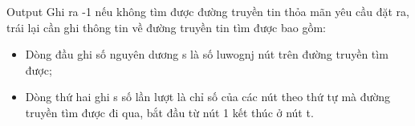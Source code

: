 Output
Ghi ra -1 nếu không tìm được đường truyền tin thỏa mãn yêu cầu đặt ra, trái lại cần ghi thông tin về đường truyền tin tìm được bao gồm:
\begin{itemize}
	\item Dòng đầu ghi số nguyên dương s là số luwognj nút trên đường truyền tìm được;
	\item Dòng thứ hai ghi s số lần lượt là chỉ số của các nút theo thứ tự mà đường truyền tìm được đi qua, bắt đầu từ nút 1 kết thúc ở nút t.
\end{itemize}